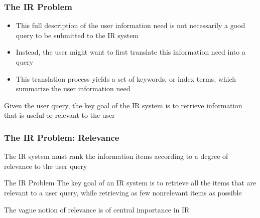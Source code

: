 \documentclass[svgnames]{beamer}
\begin{document}
\begin{frame}
  \frametitle{The IR Problem}

\begin{itemize}

\item This full description of the user information need is not necessarily a good query to be submitted to the IR system
\item Instead, the user might want to first translate this information need into a \alert{query}
\item This translation process yields a set of keywords, or index terms, which summarize the user information need
\end{itemize}

\vfill

\begin{block}{}
Given the user query, the key goal of the IR system is to retrieve
information that is useful or relevant to the user
\end{block}

\end{frame}



\begin{frame}
  \frametitle{The IR Problem: Relevance}

\begin{block}{}
 The IR system must \alert {rank the information items} according to a degree of \alert{relevance} to the user query
\end{block}

\begin{block}{The IR Problem}
The key goal of an IR system is to retrieve all the items that are relevant to a user query, while retrieving as few nonrelevant items as possible
\end{block}

\begin{block}{}
 The vague notion of \alert{relevance is of central importance in IR}
\end{block}

\end{frame}
\end{document}
